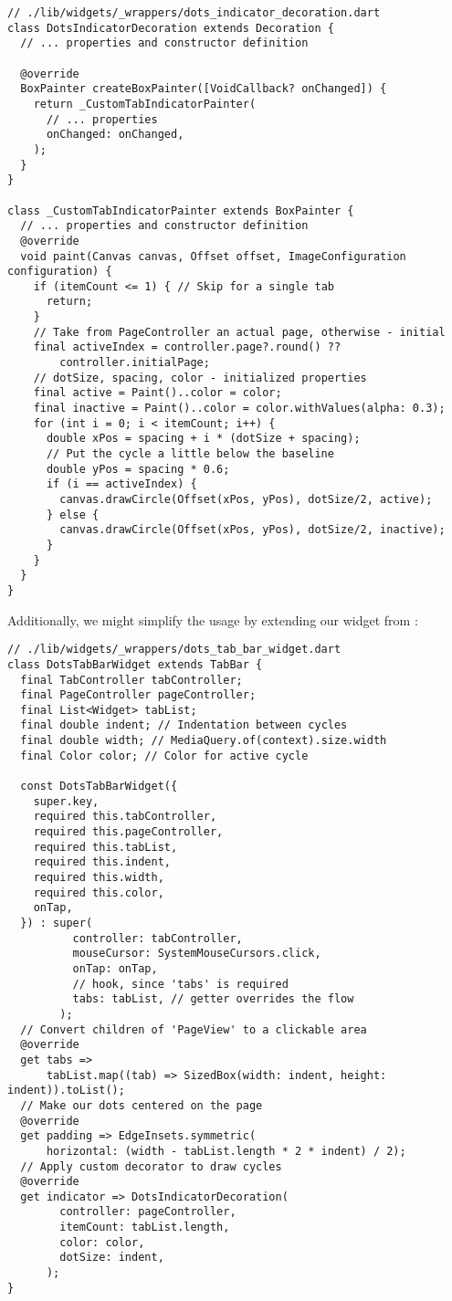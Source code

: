 \begin{lstlisting}
// ./lib/widgets/_wrappers/dots_indicator_decoration.dart
class DotsIndicatorDecoration extends Decoration {
  // ... properties and constructor definition

  @override
  BoxPainter createBoxPainter([VoidCallback? onChanged]) {
    return _CustomTabIndicatorPainter(
      // ... properties
      onChanged: onChanged,
    );
  }
}

class _CustomTabIndicatorPainter extends BoxPainter {
  // ... properties and constructor definition
  @override
  void paint(Canvas canvas, Offset offset, ImageConfiguration configuration) {
    if (itemCount <= 1) { // Skip for a single tab
      return;
    }
    // Take from PageController an actual page, otherwise - initial
    final activeIndex = controller.page?.round() ?? 
        controller.initialPage;
    // dotSize, spacing, color - initialized properties
    final active = Paint()..color = color;
    final inactive = Paint()..color = color.withValues(alpha: 0.3);
    for (int i = 0; i < itemCount; i++) {
      double xPos = spacing + i * (dotSize + spacing);
      // Put the cycle a little below the baseline
      double yPos = spacing * 0.6; 
      if (i == activeIndex) {
        canvas.drawCircle(Offset(xPos, yPos), dotSize/2, active);
      } else {
        canvas.drawCircle(Offset(xPos, yPos), dotSize/2, inactive);
      }
    }
  }
}
\end{lstlisting}

\noindent Additionally, we might simplify the usage by extending our widget from :

\begin{lstlisting}
// ./lib/widgets/_wrappers/dots_tab_bar_widget.dart
class DotsTabBarWidget extends TabBar {
  final TabController tabController;
  final PageController pageController;
  final List<Widget> tabList;
  final double indent; // Indentation between cycles
  final double width; // MediaQuery.of(context).size.width
  final Color color; // Color for active cycle

  const DotsTabBarWidget({
    super.key,
    required this.tabController,
    required this.pageController,
    required this.tabList,
    required this.indent,
    required this.width,
    required this.color,
    onTap,
  }) : super(
          controller: tabController,
          mouseCursor: SystemMouseCursors.click,
          onTap: onTap,
          // hook, since 'tabs' is required
          tabs: tabList, // getter overrides the flow
        );
  // Convert children of 'PageView' to a clickable area 
  @override
  get tabs =>
      tabList.map((tab) => SizedBox(width: indent, height: indent)).toList();
  // Make our dots centered on the page
  @override
  get padding => EdgeInsets.symmetric(
      horizontal: (width - tabList.length * 2 * indent) / 2);
  // Apply custom decorator to draw cycles
  @override
  get indicator => DotsIndicatorDecoration(
        controller: pageController,
        itemCount: tabList.length,
        color: color,
        dotSize: indent,
      );
}
\end{lstlisting}
